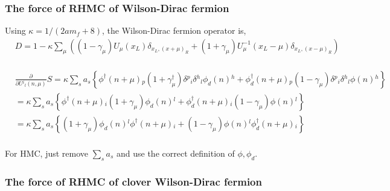 \subsubsection{\label{sec:cw.rhmc}The force of RHMC of Wilson-Dirac fermion}

Using $\kappa=1/(2am_f+8)$, the Wilson-Dirac fermion operator is,
\begin{equation}
\begin{split}
&D=1-\kappa\sum _{\mu}\left((1-\gamma _{\mu})U_{\mu}(x _L)\delta _{x _L,(x+\mu)_R}+(1+\gamma _{\mu})U_{\mu}^{-1}(x _L-\mu)\delta _{x_L,(x-\mu)_R}\right)\\
\end{split}
\end{equation}

\begin{equation}
\begin{split}
&\frac{\partial}{\partial U{}^i{}_l(n,\mu)}S=\kappa\sum _sa_s{} \left\{\phi ^{\dagger}(n+\mu){}_p(1+\gamma ^{\dagger}_{\mu})\delta {}^p{}_i\delta {}^h{}_l \phi _d(n) {}^h+\phi ^{\dagger}_d(n+\mu){}_p(1-\gamma _{\mu})\delta {}^p{}_i\delta {}^h{}_l \phi (n) {}^h\right\}\\
&=\kappa\sum _sa_s{} \left\{\phi ^{\dagger}(n+\mu){}_i(1+\gamma _{\mu}) \phi _d(n) {}^l+\phi ^{\dagger}_d(n+\mu){}_i(1-\gamma _{\mu}) \phi (n) {}^l\right\}\\
&=\kappa\sum _sa_s{} \left\{(1+\gamma _{\mu}) \phi _d(n) {}^l\phi ^{\dagger}(n+\mu){}_i+(1-\gamma _{\mu}) \phi (n) {}^l\phi ^{\dagger}_d(n+\mu){}_i\right\}\\
\end{split}
\end{equation}

For HMC, just remove $\sum _sa_s$ and use the correct definition of $\phi,\phi_d$.

\subsubsection{\label{sec:cw.rhmccw}The force of RHMC of clover Wilson-Dirac fermion}


